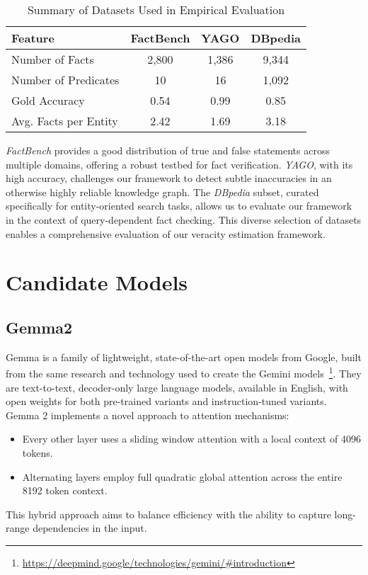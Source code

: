 \begin{table}[h!]
    \centering
    \begin{tabular}{lccc}
        \toprule
        \textbf{Feature} & \textbf{FactBench} & \textbf{YAGO} & \textbf{DBpedia} \\
        \midrule
        Number of Facts & 2,800 & 1,386 & 9,344 \\
        Number of Predicates & 10 & 16 & 1,092 \\
        Gold Accuracy & 0.54 & 0.99 & 0.85 \\
        Avg. Facts per Entity & 2.42 & 1.69 & 3.18 \\
        \bottomrule
    \end{tabular}
    \caption{Summary of Datasets Used in Empirical Evaluation}
    \label{tab:dataset-summary}
\end{table}

\textit{FactBench} provides a good distribution of true and false statements across multiple domains, offering a robust testbed for fact verification.
\textit{YAGO}, with its high accuracy, challenges our framework to detect subtle inaccuracies in an otherwise highly reliable knowledge graph.
The \textit{DBpedia} subset, curated specifically for entity-oriented search tasks, allows us to evaluate our framework in the context of query-dependent fact checking.
This diverse selection of datasets enables a comprehensive evaluation of our veracity estimation framework.

\section{Candidate Models}\label{sec:empirical-evaluation:candidate-models}
\subsection{Gemma2}\label{subsec:empirical-evaluation:candidate-models:gemma2}
Gemma is a family of lightweight, state-of-the-art open models from Google, built from the same research and technology used to create the Gemini models~\footnote{\url{https://deepmind.google/technologies/gemini/#introduction}}.
They are text-to-text, decoder-only large language models, available in English, with open weights for both pre-trained variants and instruction-tuned variants.
Gemma 2 implements a novel approach to attention mechanisms:
\begin{itemize}
    \item Every other layer uses a sliding window attention with a local context of 4096 tokens.
    \item Alternating layers employ full quadratic global attention across the entire 8192 token context.
\end{itemize}
This hybrid approach aims to balance efficiency with the ability to capture long-range dependencies in the input.

